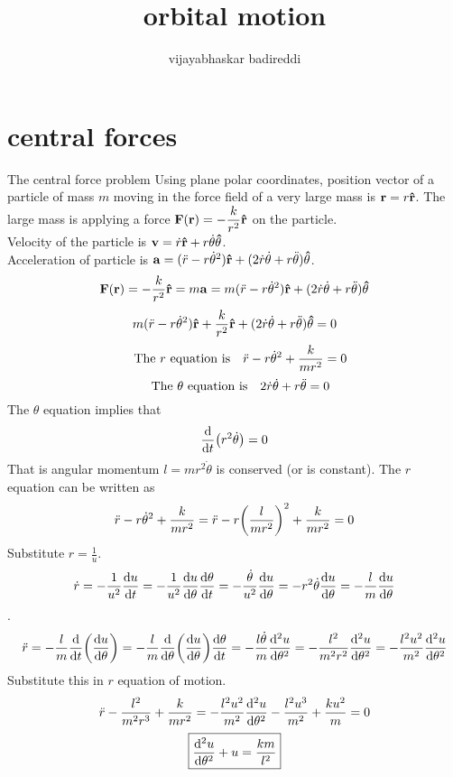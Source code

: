\documentclass[12pt]{article}
\title{orbital motion}
\author{vijayabhaskar badireddi}
\begin{document}

\section*{central forces}
The central force problem
Using plane polar coordinates, position vector of a particle of mass $m$ moving in the force field of a very large mass is $\vb{r}=r\vu{r}$. The large mass is applying a force $\displaystyle\vb{F}(\vb{r})=-\frac{k}{r^2}\vu{r}$ on the particle.\\
Velocity of the particle is $\displaystyle \vb{v}=\dot{r}\vu{r}+r\dot{\theta}\vu{\theta}$.\\
Acceleration of particle is $ \vb{a}=(\ddot{r}-r\dot{\theta}^2)\vu{r}+(2\dot{r}\dot{\theta}+r\ddot{\theta})\vu{\theta}$.
\[\vb{F}(\vb{r})=-\frac{k}{r^2}\vu{r}=m\vb{a}=m(\ddot{r}-r\dot{\theta}^2)\vu{r}+(2\dot{r}\dot{\theta}+r\ddot{\theta})\vu{\theta}\]
\[m(\ddot{r}-r\dot{\theta}^2)\vu{r}+\frac{k}{r^2}\vu{r}+(2\dot{r}\dot{\theta}+r\ddot{\theta})\vu{\theta}=0\]
\[\qq{The $r$ equation is} \ddot{r}-r\dot{\theta}^2+\frac{k}{mr^2} =0\]
\[\qq{The $\theta$ equation is} 2\dot{r}\dot{\theta}+r\ddot{\theta}=0\]
The $\theta$ equation implies that \[\dv{t}(r^2\dot{\theta})=0\]
That is angular momentum $l=mr^2\dot{\theta}$ is conserved (or is constant).
The $r$ equation can be written as \[\ddot{r}-r\dot{\theta}^2+\frac{k}{mr^2}=\ddot{r}-r\qty(\frac{l}{mr^2})^2+\frac{k}{mr^2}=0\]
Substitute $r=\frac{1}{u}$.
\[\dot{r}=-\frac{1}{u^2}\dv{u}{t}=-\frac{1}{u^2}\dv{u}{\theta}\dv{\theta}{t}=-\frac{\dot{\theta}}{u^2}\dv{u}{\theta}=-r^2\dot{\theta}\dv{u}{\theta}=-\frac{l}{m}\dv{u}{\theta}\].
\[\ddot{r}=-\frac{l}{m}\dv{t}\qty(\dv{u}{\theta})=-\frac{l}{m}\dv{\theta}\qty(\dv{u}{\theta})\dv{\theta}{t}=-\frac{l\dot{\theta}}{m}\dv[2]{u}{\theta}=-\frac{l^2}{m^2r^2}\dv[2]{u}{\theta}=-\frac{l^2u^2}{m^2}\dv[2]{u}{\theta}\]
Substitute this in $r$ equation of motion.
\[\ddot{r}-\frac{l^2}{m^2r^3}+\frac{k}{mr^2}=-\frac{l^2u^2}{m^2}\dv[2]{u}{\theta}-\frac{l^2u^3}{m^2}+\frac{ku^2}{m}=0\]
\[\boxed{\dv[2]{u}{\theta}+u=\frac{km}{l^2}}\]
\end{document}

